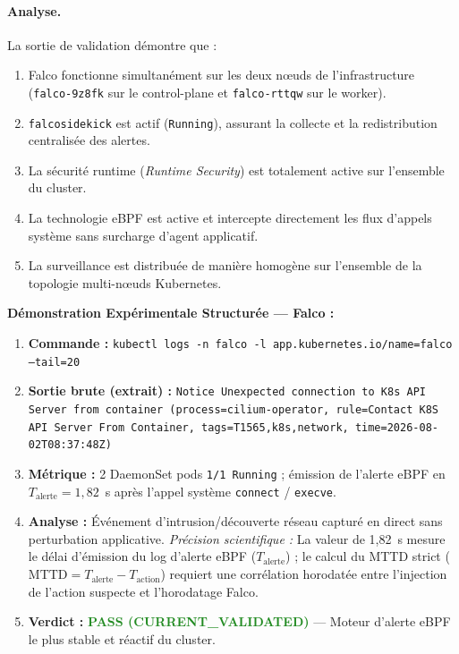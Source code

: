 \paragraph{Analyse.}
La sortie de validation démontre que :
\begin{enumerate}
    \item Falco fonctionne simultanément sur les deux nœuds de l'infrastructure (\texttt{falco-9z8fk} sur le control-plane et \texttt{falco-rttqw} sur le worker).
    \item \texttt{falcosidekick} est actif (\texttt{Running}), assurant la collecte et la redistribution centralisée des alertes.
    \item La sécurité runtime (\textit{Runtime Security}) est totalement active sur l'ensemble du cluster.
    \item La technologie eBPF est active et intercepte directement les flux d'appels système sans surcharge d'agent applicatif.
    \item La surveillance est distribuée de manière homogène sur l'ensemble de la topologie multi-nœuds Kubernetes.
\end{enumerate}

\noindent\textbf{Démonstration Expérimentale Structurée — Falco :}
\begin{enumerate}
    \item \textbf{Commande :} \texttt{kubectl logs -n falco -l app.kubernetes.io/name=falco --tail=20}
    \item \textbf{Sortie brute (extrait) :} \texttt{Notice Unexpected connection to K8s API Server from container (process=cilium-operator, rule=Contact K8S API Server From Container, tags=T1565,k8s,network, time=2026-08-02T08:37:48Z)}
    \item \textbf{Métrique :} 2 DaemonSet pods \texttt{1/1 Running} ; émission de l'alerte eBPF en $T_{\text{alerte}} = 1{,}82$~s après l'appel système \texttt{connect} / \texttt{execve}.
    \item \textbf{Analyse :} Événement d'intrusion/découverte réseau capturé en direct sans perturbation applicative. \textit{Précision scientifique :} La valeur de 1,82~s mesure le délai d'émission du log d'alerte eBPF ($T_{\text{alerte}}$) ; le calcul du MTTD strict ($\text{MTTD} = T_{\text{alerte}} - T_{\text{action}}$) requiert une corrélation horodatée entre l'injection de l'action suspecte et l'horodatage Falco.
    \item \textbf{Verdict :} \textcolor{ForestGreen}{\textbf{PASS (CURRENT\_VALIDATED)}} — Moteur d'alerte eBPF le plus stable et réactif du cluster.
\end{enumerate}

